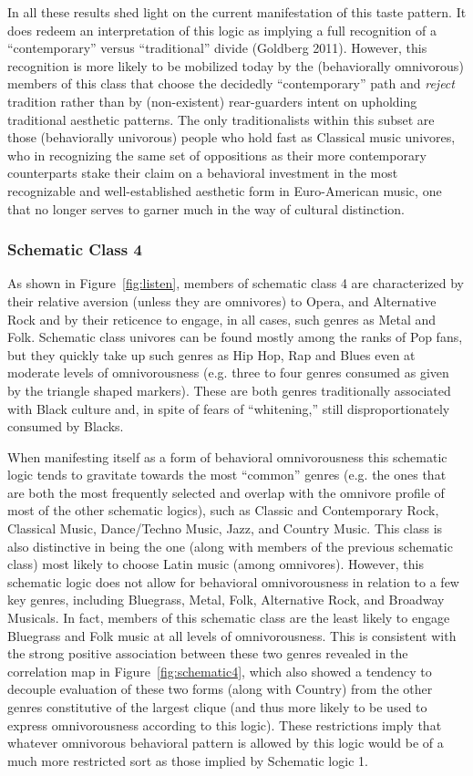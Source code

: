 \documentclass[preprint,12pt]{elsarticle}
\begin{document}
In all these results shed light on the current manifestation of this taste pattern. It does redeem an interpretation of this logic as implying a full recognition of a ``contemporary'' versus ``traditional'' divide (Goldberg 2011). However, this recognition is more likely to be mobilized today by the (behaviorally omnivorous) members of this class that choose the decidedly ``contemporary'' path and \emph{reject} tradition rather than by (non-existent) rear-guarders intent on upholding traditional aesthetic patterns. The only traditionalists within this subset are those (behaviorally univorous) people who hold fast as Classical music univores, who in recognizing the same set of oppositions as their more contemporary counterparts stake their claim on a behavioral investment in the most recognizable and well-established aesthetic form in Euro-American music, one that no longer serves to garner much in the way of cultural distinction. 

\subsubsection{Schematic Class 4}
As shown in Figure~\ref{fig:listen}, members of schematic class 4 are characterized by their relative aversion (unless they are omnivores) to Opera, and Alternative Rock and by their reticence to engage, in all cases, such genres as Metal and Folk. Schematic class univores can be found mostly among the ranks of Pop fans, but they quickly take up such genres as Hip Hop, Rap and Blues even at moderate levels of omnivorousness (e.g. three to four genres consumed as given by the triangle shaped markers). These are both genres traditionally associated with Black culture and, in spite of fears of ``whitening,'' still disproportionately consumed by Blacks. 

When manifesting itself as a form of behavioral omnivorousness this schematic logic tends to gravitate towards the most ``common'' genres (e.g. the ones that are both the most frequently selected and overlap with the omnivore profile of most of the other schematic logics), such as Classic and Contemporary Rock, Classical Music, Dance/Techno Music, Jazz, and Country Music. This class is also distinctive in being the one (along with members of the previous schematic class) most likely to choose Latin music (among omnivores). However, this schematic logic does not allow for behavioral omnivorousness in relation to a few key genres, including Bluegrass, Metal, Folk, Alternative Rock, and Broadway Musicals. In fact, members of this schematic class are the least likely to engage Bluegrass and Folk music at all levels of omnivorousness. This is consistent with the strong positive association between these two genres revealed in the correlation map in Figure~\ref{fig:schematic4}, which also showed a tendency to decouple evaluation of these two forms (along with Country) from the other genres constitutive of the largest clique (and thus more likely to be used to express omnivorousness according to this logic).  These restrictions imply that whatever omnivorous behavioral pattern is allowed by this logic would be of a much more restricted sort as those implied by Schematic logic 1. 
\end{document}
